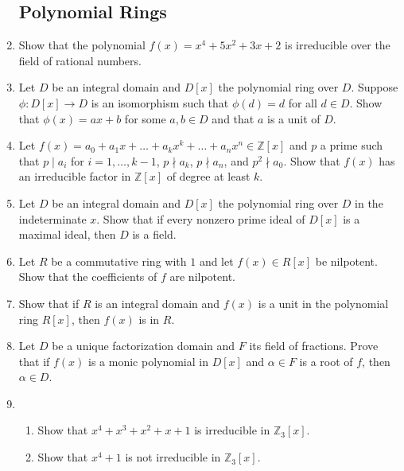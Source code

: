 \documentclass{article}
\theoremstyle{definition}
\newcommand{\Z}{\mathbb{Z}}
\begin{document}
\begin{enumerate}
        \subsection{Polynomial Rings}

            \item Show that the polynomial $f(x)=x^4+5x^2+3x+2$ is irreducible over the field of rational numbers.
            
            \item Let $D$ be an integral domain and $D[x]$ the polynomial ring over $D$. Suppose $\phi : D[x] \to D$ is an isomorphism such that $\phi(d)=d$ for all $d\in D$. Show that $\phi(x)=ax+b$ for some $a,b\in D$ and that $a$ is a unit of $D$.
            
            \item Let $f(x)=a_0+a_1x+\hdots +a_kx^k+\hdots +a_nx^n \in \Z[x]$ and $p$ a prime such that $p\mid a_i$ for $i=1,\hdots,k-1$, $p\nmid a_k$, $p\nmid a_n$, and $p^2\nmid a_0$. Show that $f(x)$ has an irreducible factor in $\Z[x]$ of degree at least $k$.
            
            \item Let $D$ be an integral domain and $D[x]$ the polynomial ring over $D$ in the indeterminate $x$. Show that if every nonzero prime ideal of $D[x]$ is a maximal ideal, then $D$ is a field.
            
            \item Let $R$ be a commutative ring with $1$ and let $f(x)\in R[x]$ be nilpotent. Show that the coefficients of $f$ are nilpotent.
            
            \item Show that if $R$ is an integral domain and $f(x)$ is a unit in the polynomial ring $R[x]$, then $f(x)$ is in $R$.
            
            \item Let $D$ be a unique factorization domain and $F$ its field of fractions. Prove that if $f(x)$ is a monic polynomial in $D[x]$ and $\alpha \in F$ is a root of $f$, then $\alpha \in D$.
            
            \item
            
            \begin{enumerate}
                \item Show that $x^4+x^3+x^2+x+1$ is irreducible in $\Z_3[x]$.
                \item Show that $x^4+1$ is not irreducible in $\Z_3[x]$.
            \end{enumerate}


\end{enumerate}
\end{document}
